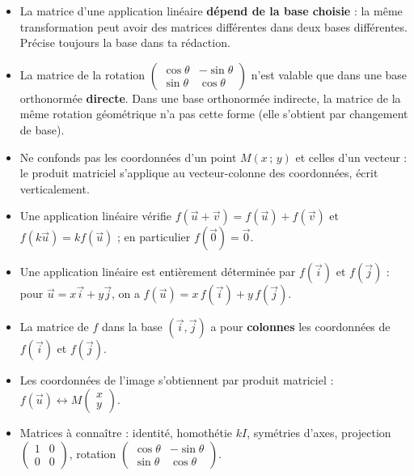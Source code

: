 \documentclass[11pt]{article}
\begin{document}
\begin{attention}
\begin{itemize}
\item La matrice d'une application linéaire \textbf{dépend de la base choisie} : la même transformation peut avoir des matrices différentes dans deux bases différentes. Précise toujours la base dans ta rédaction.
\item La matrice de la rotation $\begin{pmatrix} \cos\theta & -\sin\theta \\ \sin\theta & \cos\theta \end{pmatrix}$ n'est valable que dans une base orthonormée \textbf{directe}. Dans une base orthonormée indirecte, la matrice de la même rotation géométrique n'a pas cette forme (elle s'obtient par changement de base).
\item Ne confonds pas les coordonnées d'un point $M(x\,;\,y)$ et celles d'un vecteur : le produit matriciel s'applique au vecteur-colonne des coordonnées, écrit verticalement.
\end{itemize}
\end{attention}

\begin{aretenir}
\begin{itemize}
\item Une application linéaire vérifie $f(\vec{u}+\vec{v}) = f(\vec{u})+f(\vec{v})$ et $f(k\vec{u}) = kf(\vec{u})$ ; en particulier $f(\vec{0})=\vec{0}$.
\item Une application linéaire est entièrement déterminée par $f(\vec{i})$ et $f(\vec{j})$ : pour $\vec{u}=x\vec{i}+y\vec{j}$, on a $f(\vec{u}) = x\,f(\vec{i})+y\,f(\vec{j})$.
\item La matrice de $f$ dans la base $(\vec{i},\vec{j})$ a pour \textbf{colonnes} les coordonnées de $f(\vec{i})$ et $f(\vec{j})$.
\item Les coordonnées de l'image s'obtiennent par produit matriciel : $f(\vec{u}) \longleftrightarrow M\begin{pmatrix} x \\ y \end{pmatrix}$.
\item Matrices à connaître : identité, homothétie $kI$, symétries d'axes, projection $\begin{pmatrix} 1 & 0 \\ 0 & 0 \end{pmatrix}$, rotation $\begin{pmatrix} \cos\theta & -\sin\theta \\ \sin\theta & \cos\theta \end{pmatrix}$.
\end{itemize}
\end{aretenir}
\end{document}
